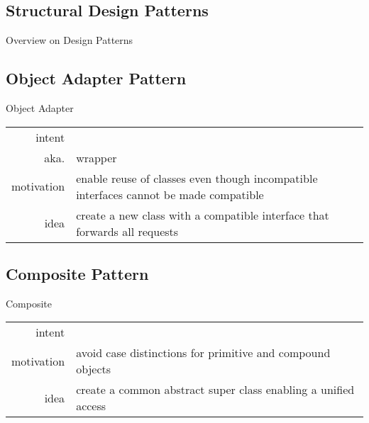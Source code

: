 \subsection{Structural Design Patterns}
\begin{frame}[label=structuralpatterns]{Overview on Design Patterns \mytitlesource{\gof}}
	\centering{}
\end{frame}

\subsection{Object Adapter Pattern}
\begin{frame}{\insertsubsection} %
	\begin{fancycolumns}
		\begin{definition}{Object Adapter \mysource{\gof}}
			\setlength\tabcolsep{1mm}
			\begin{tabularx}{\textwidth}{rX}				
				intent & \mycite{Convert the interface of a class into another interface clients expect. Adapter lets classes work together that couldn't otherwise because of incompatible interfaces.}\\
				aka. & wrapper\\
				motivation & enable reuse of classes even though incompatible interfaces cannot be made compatible\\
				idea & create a new class with a compatible interface that forwards all requests
			\end{tabularx}
		\end{definition}
		\nextcolumn
	\end{fancycolumns}
\end{frame}

\subsection{Composite Pattern}
\begin{frame}{\insertsubsection}
	\begin{fancycolumns}[height=2cm]
		\begin{definition}{Composite \mysource{\gof}}
			\setlength\tabcolsep{1mm}
			\begin{tabularx}{\textwidth}{rX}				
				intent & \mycite{Compose objects into tree structures to represent part-whole hierarchies. Composite lets clients treat individual objects and compositions of objects uniformly.}\\
				motivation & avoid case distinctions for primitive and compound objects\\
				idea & create a common abstract super class enabling a unified access
			\end{tabularx}
		\end{definition}
		\nextcolumn
		\composite{width=\linewidth}
	\end{fancycolumns}
\end{frame}

